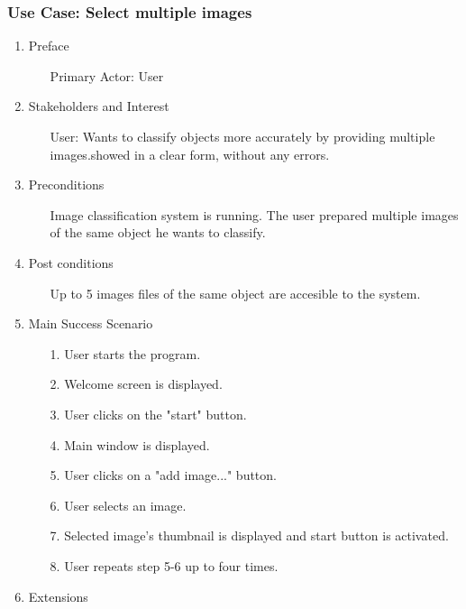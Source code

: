 \documentclass[parskip=full]{scrartcl}
\begin{document}
\pagebreak



\subsubsection {Use Case: Select multiple images}

\begin{enumerate}
	\item Preface
	\begin{itemize} [nosep]
		\item[] Primary Actor: User
	\end{itemize}
	\item Stakeholders and Interest
	\begin{itemize} [nosep]
		\item[] User: Wants to classify objects more accurately by providing multiple images.showed in a clear form, without any errors.
	\end{itemize}
	\item Preconditions
	\begin{itemize} [nosep]
		\item[] Image classification system is running. The user prepared multiple images of the same object he wants to classify.
	\end{itemize}
	\item Post conditions
	\begin{itemize} [nosep]
		\item[] Up to 5 images files of the same object are accesible to the system.
	\end{itemize}
	\item Main Success Scenario
	\begin{itemize} [nosep]
		\item[1.] User starts the program.
		\item[2.] Welcome screen is displayed.
		\item[3.] User clicks on the "start" button.
		\item[4.] Main window is displayed.
		\item[5.] User clicks on a "add image..." button.
		\item[6.] User selects an image.
		\item[7.] Selected image's thumbnail is displayed and start button is activated.
		\item[8.] User repeats step 5-6 up to four times.
	\end{itemize}
	\item Extensions

\end{enumerate}
\end{document}
